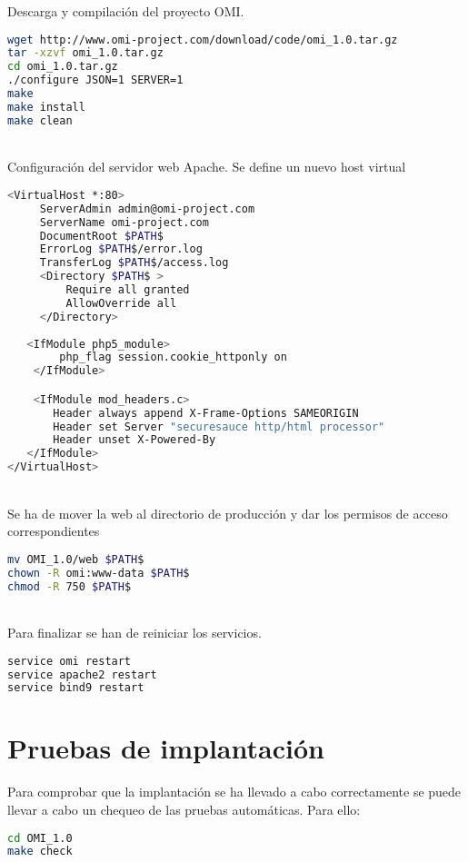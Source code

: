 Descarga y compilación del proyecto OMI.

\begin{lstlisting}[language=bash]
wget http://www.omi-project.com/download/code/omi_1.0.tar.gz
tar -xzvf omi_1.0.tar.gz
cd omi_1.0.tar.gz
./configure JSON=1 SERVER=1
make
make install
make clean
\end{lstlisting}
\hfill\\

Configuración del servidor web Apache. Se define un nuevo host virtual

\begin{lstlisting}[language=bash]
<VirtualHost *:80>
     ServerAdmin admin@omi-project.com
     ServerName omi-project.com
     DocumentRoot $PATH$
     ErrorLog $PATH$/error.log
     TransferLog $PATH$/access.log
     <Directory $PATH$ >
         Require all granted
         AllowOverride all
     </Directory>
   
   <IfModule php5_module>
	    php_flag session.cookie_httponly on
	</IfModule>

	<IfModule mod_headers.c>
       Header always append X-Frame-Options SAMEORIGIN
       Header set Server "securesauce http/html processor"
       Header unset X-Powered-By
   </IfModule>
</VirtualHost>
\end{lstlisting}
\hfill\\

Se ha de mover la web al directorio de producción y dar los permisos de acceso correspondientes
\begin{lstlisting}[language=bash]
mv OMI_1.0/web $PATH$
chown -R omi:www-data $PATH$
chmod -R 750 $PATH$
\end{lstlisting}
\hfill\\

Para finalizar se han de reiniciar los servicios.
\begin{lstlisting}[language=bash]
service omi restart
service apache2 restart
service bind9 restart
\end{lstlisting}

\section{Pruebas de implantación}
Para comprobar que la implantación se ha llevado a cabo correctamente se puede llevar a cabo un chequeo de las pruebas automáticas. Para ello:
\begin{lstlisting}[language=bash]
cd OMI_1.0
make check
\end{lstlisting}
\hfill\\

